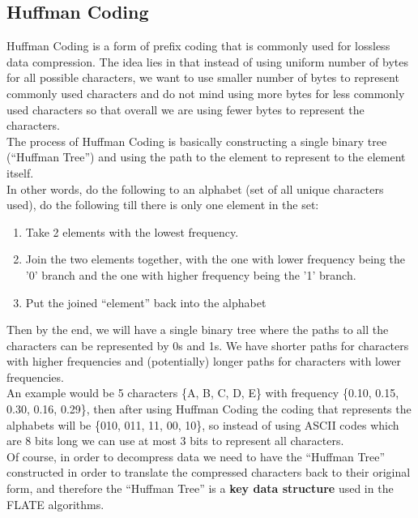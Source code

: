 \documentclass[12pt]{article}
\begin{document}
    \subsection{Huffman Coding}
    Huffman Coding is a form of prefix coding that is commonly used for lossless data compression. The idea lies in that instead of using uniform number of bytes for all possible characters, we want to use smaller number of bytes to represent commonly used characters and do not mind using more bytes for less commonly used characters so that overall we are using fewer bytes to represent the characters.\\
    The process of Huffman Coding is basically constructing a single binary tree (``Huffman Tree'') and using the path to the element to represent to the element itself.\\
    In other words, do the following to an alphabet (set of all unique characters used), do the following till there is only one element in the set:
    \begin{enumerate}
        \item Take 2 elements with the lowest frequency.
        \item Join the two elements together, with the one with lower frequency being the '0' branch and the one with higher frequency being the '1' branch.
        \item Put the joined ``element'' back into the alphabet
    \end{enumerate}
    Then by the end, we will have a single binary tree where the paths to all the characters can be represented by 0s and 1s. We have shorter paths for characters with higher frequencies and (potentially) longer paths for characters with lower frequencies.\\
    An example would be 5 characters \{A, B, C, D, E\} with frequency \{0.10, 0.15, 0.30, 0.16, 0.29\}, then after using Huffman Coding the coding that represents the alphabets will be \{010, 011, 11, 00, 10\}, so instead of using ASCII codes which are 8 bits long we can use at most 3 bits to represent all characters.\\
    Of course, in order to decompress data we need to have the ``Huffman Tree'' constructed in order to translate the compressed characters back to their original form, and therefore the ``Huffman Tree'' is a \textbf{key data structure} used in the FLATE algorithms.
\end{document}
